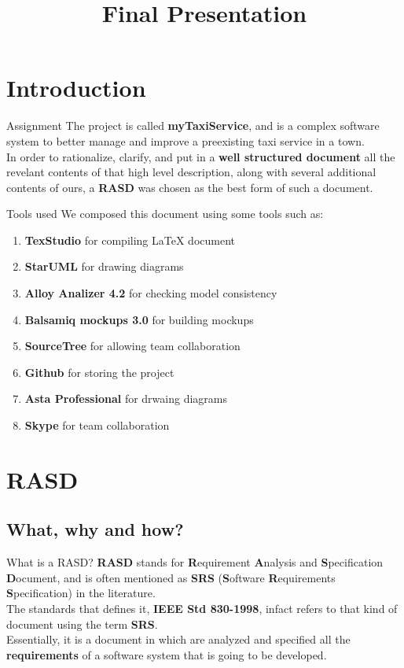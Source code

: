 \documentclass{../common/latex_classes/pdf_presentation}
\title{Final Presentation}
\begin{document}
	\titleToc{}
	\section{Introduction}
	\begin{frame}{Assignment}
		The project is called \textbf{myTaxiService}, and is a complex software system to better manage and improve a preexisting taxi service in a town.\\
		In order to rationalize, clarify, and put in a \textbf{well structured document} all the revelant contents of that high level description, along with several additional contents of ours, a \textbf{RASD} was chosen as the best form of such a document.\\
	\end{frame}
	\begin{frame}{Tools used}
		We composed this document using some tools such as:
		\begin{enumerate}
			\item\textbf{TexStudio} for compiling \LaTeX{} document
			\item\textbf{StarUML} for drawing diagrams
			\item\textbf{Alloy Analizer 4.2} for checking model consistency
			\item\textbf{Balsamiq mockups 3.0} for building mockups
			\item\textbf{SourceTree} for allowing team collaboration
			\item\textbf{Github} for storing the project 
			\item\textbf{Asta Professional} for drwaing diagrams
			\item\textbf{Skype} for team collaboration
		\end{enumerate}		
	\end{frame}
	\section{RASD}
	\subsection{What, why and how?}
	\begin{frame}{What is a RASD?}
		\textbf{RASD} stands for \textbf{R}equirement \textbf{A}nalysis and \textbf{S}pecification \textbf{D}ocument, and is often mentioned as \textbf{SRS} (\textbf{S}oftware \textbf{R}equirements \textbf{S}pecification) in the literature.\\
		The standards that defines it, \textbf{IEEE Std 830-1998}, infact refers to that kind of document using the term \textbf{SRS}.\\
		Essentially, it is a document in which are analyzed and specified all the \textbf{requirements} of a software system that is going to be developed.
	\end{frame}
\end{document}
